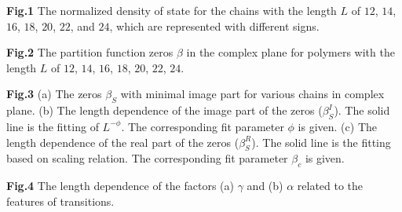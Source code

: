 \documentclass[aps,pre,twocolumn,showpacs,preprintnumbers,amsmath,amssymb]{revtex4-1}
\begin{document}
\vspace{0.5cm}
\parindent 0pt {\large {\bf Fig.1}}
The normalized density of state for the chains with the length $L$ of $12$,
$14$, $16$, $18$, $20$, $22$, and $24$, which are represented with different
signs.

\vspace{0.5cm}
\parindent 0pt {\large {\bf Fig.2}}
The partition function zeros $\beta$ in the complex plane for polymers
with the length $L$ of $12$, $14$, $16$, $18$, $20$, $22$, $24$.

\vspace{0.5cm}
\parindent 0pt {\large {\bf Fig.3}}
(a) The zeros $\beta_S$ with minimal image part for various chains in
complex plane. (b) The length dependence of the image part of the zeros
($\beta_S^I$). The solid line is the fitting of $L^{-\phi}$. The
corresponding fit parameter $\phi$ is given. (c) The length dependence
of the real part of the zeros ($\beta_S^R$). The solid line is
the fitting based on scaling relation. The corresponding fit parameter $\beta_c$ is
given.

\vspace{0.5cm}
\parindent 0pt {\large {\bf Fig.4}}
The length dependence of the factors (a) $\gamma$ and (b) $\alpha$
related to the features of transitions.


\end{document}
